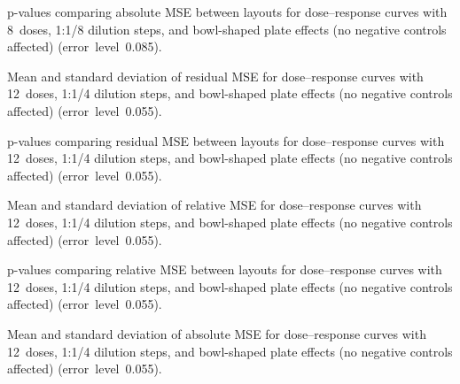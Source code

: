 \begin{table}[p]
    \centering
    \small
    
    \caption{p-values comparing absolute \ECIC{} MSE between layouts for dose--response curves with 8~doses, 1:1/8 dilution steps, and bowl-shaped plate effects (no negative controls affected) (error~level~0.085).}
    \label{tab:dr-absic50-pvalues-8doses-dil8-bowl-0.085}
\end{table}

\clearpage
\begin{table}[p]
    \centering
    \small
    
    \caption{Mean and standard deviation of residual MSE for dose--response curves with 12~doses, 1:1/4 dilution steps, and bowl-shaped plate effects (no negative controls affected) (error~level~0.055).}
    \label{tab:dr-residuals-mean-std-12doses-dil4-bowl-0.055}
\end{table}

\begin{table}[p]
    \centering
    \small
    
    \caption{p-values comparing residual MSE between layouts for dose--response curves with 12~doses, 1:1/4 dilution steps, and bowl-shaped plate effects (no negative controls affected) (error~level~0.055).}
    \label{tab:dr-residuals-pvalues-12doses-dil4-bowl-0.055}
\end{table}

\begin{table}[p]
    \centering
    \small
    
    \caption{Mean and standard deviation of relative \ECIC{} MSE for dose--response curves with 12~doses, 1:1/4 dilution steps, and bowl-shaped plate effects (no negative controls affected) (error~level~0.055).}
    \label{tab:dr-relic50-mean-std-12doses-dil4-bowl-0.055}
\end{table}

\begin{table}[p]
    \centering
    \small
    
    \caption{p-values comparing relative \ECIC{} MSE between layouts for dose--response curves with 12~doses, 1:1/4 dilution steps, and bowl-shaped plate effects (no negative controls affected) (error~level~0.055).}
    \label{tab:dr-relic50-pvalues-12doses-dil4-bowl-0.055}
\end{table}

\begin{table}[p]
    \centering
    \small
    
    \caption{Mean and standard deviation of absolute \ECIC{} MSE for dose--response curves with 12~doses, 1:1/4 dilution steps, and bowl-shaped plate effects (no negative controls affected) (error~level~0.055).}
    \label{tab:dr-absic50-mean-std-12doses-dil4-bowl-0.055}
\end{table}

